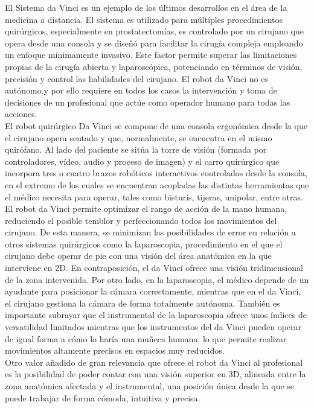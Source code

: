 El Sistema da Vinci es un ejemplo de los últimos desarrollos en el área de la medicina a distancia. El sistema es utilizado para múltiples procedimientos quirúrgicos, especialmente en prostatectomías, es controlado por un cirujano que opera desde una consola y se diseñó para facilitar la cirugía compleja empleando un enfoque mínimamente invasivo. Este factor permite superar las limitaciones propias de la cirugía abierta y laparoscópica, potenciando en términos de visión, precisión y control las habilidades del cirujano. El robot da Vinci no es autónomo,y por ello requiere en todos los casos la intervención y toma de decisiones de un profesional que actúe como operador humano para todas las acciones.\\


El robot quirúrgico Da Vinci se compone de una consola ergonómica desde la que el cirujano opera sentado y que, normalmente, se encuentra en el mismo quirófano. Al lado del paciente se sitúa la torre de visión (formada por controladores, vídeo, audio y proceso de imagen) y el carro quirúrgico que incorpora tres o cuatro brazos robóticos interactivos controlados desde la consola, en el extremo de los cuales se encuentran acopladas las distintas herramientas que el médico necesita para operar, tales como bisturís, tijeras, unipolar, entre otras.\\


El robot da Vinci permite optimizar el rango de acción de la mano humana, reduciendo el posible temblor y perfeccionando todos los movimientos del cirujano. De esta manera, se minimizan las posibilidades de error en relación a otros sistemas quirúrgicos como la laparoscopia, procedimiento en el que el cirujano debe operar de pie con una visión del área anatómica en la que interviene en 2D. En contraposición, el da Vinci ofrece una visión tridimensional de la zona intervenida. Por otro lado, en la laparoscopia, el médico depende de un ayudante para posicionar la cámara correctamente, mientras que en el da Vinci, el cirujano gestiona la cámara de forma totalmente autónoma. También es importante subrayar que el instrumental de la laparoscopia ofrece unos índices de versatilidad limitados mientras que los instrumentos del da Vinci pueden operar de igual forma a cómo lo haría una muñeca humana, lo que permite realizar movimientos altamente precisos en espacios muy reducidos.\\


Otro valor añadido de gran relevancia que ofrece el robot da Vinci al profesional es la posibilidad de poder contar con una visión superior en 3D, alineada entre la zona anatómica afectada y el instrumental, una posición única desde la que se puede trabajar de forma cómoda, intuitiva y precisa.\\


